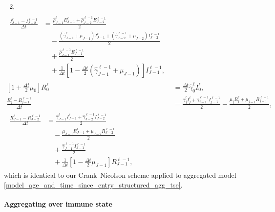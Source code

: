 \documentclass[USenglish]{article}
\begin{document}
\begin{subequations}
\begin{align}
\begin{split}
      {2},
    \end{split}
    \\
    \begin{split}
      \frac{I_{J - 1}^{\ell} - I_{J - 2}^{\ell - 1}}{\Delta t}
      &= \frac{\hat{\rho}_{J - 1}^{\ell} E_{J - 1}^{\ell}
        + \hat{\rho}_{J - 2}^{\ell - 1} E_{J - 2}^{\ell - 1}} {2}
      \\ & \quad {}
      - \frac{(\hat{\gamma}_{J - 1}^{\ell} + \mu_{J - 1}) I_{J - 1}^{\ell}
        + (\hat{\gamma}_{J - 2}^{\ell - 1} + \mu_{J - 2}) I_{J - 2}^{\ell - 1}}
      {2}
      \\ & \quad {}
      + \frac{\hat{\rho}_{J - 1}^{\ell - 1} E_{J - 1}^{\ell - 1}} {2}
      \\ & \quad {}
      + \frac{1}{\Delta t} \left[
        1 - \frac{\Delta t}{2} (\hat{\gamma}_{J - 1}^{\ell - 1} + \mu_{J - 1})
      \right] I_{J - 1}^{\ell - 1},
    \end{split}
    \\
    \left[1 + \frac{\Delta t}{2} \mu_0\right] R_0^{\ell}
    &= \frac{\Delta t}{2} \hat{\gamma}_0^{\ell} I_0^{\ell},
    \\
    \frac{R_j^{\ell} - R_{j - 1}^{\ell - 1}}{\Delta t}
    &= \frac{\hat{\gamma}_j^{\ell} I_j^{\ell}
      + \hat{\gamma}_{j - 1}^{\ell - 1} I_{j - 1}^{\ell - 1}}
      {2}
      - \frac{\mu_j R_j^{\ell}
      + \mu_{j - 1} R_{j - 1}^{\ell - 1}}
      {2},
    \\
    \begin{split}
      \frac{R_{J - 1}^{\ell} - R_{J - 2}^{\ell - 1}}{\Delta t}
      &= \frac{\hat{\gamma}_{J - 1}^{\ell} I_{J - 1}^{\ell}
        + \hat{\gamma}_{J - 2}^{\ell - 1} I_{J - 2}^{\ell - 1}}
      {2}
      \\ & \quad {}
      - \frac{\mu_{J - 1} R_{J - 1}^{\ell}
        + \mu_{J - 2} R_{J - 2}^{\ell - 1}}
      {2}
      \\ & \quad {}
      + \frac{\hat{\gamma}_{J - 1}^{\ell - 1} I_{J - 1}^{\ell - 1}}{2}
      \\ & \quad {}
      + \frac{1}{\Delta t} \left[
        1 - \frac{\Delta t}{2} \mu_{J - 1}
      \right] R_{J - 1}^{\ell - 1},
    \end{split}
  \end{align}
\end{subequations}
which is identical to our Crank--Nicolson scheme applied to aggregated
model \eqref{model_age_and_time_since_entry_structured_agg_tse}.


\paragraph{Aggregating over immune state}
\end{document}

